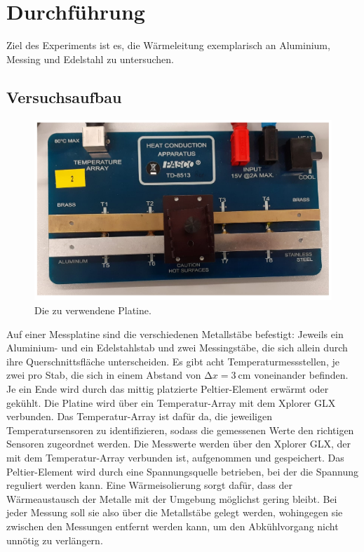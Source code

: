 \section{Durchführung}
\label{sec:Durchführung}
Ziel des Experiments ist es, die Wärmeleitung exemplarisch an Aluminium, Messing und Edelstahl zu untersuchen. 
\subsection{Versuchsaufbau}
\begin{figure}
    \centering
    \includegraphics[width=\textwidth]{content/platine_photo.pdf}
    \caption{Die zu verwendene Platine.}
    \label{fig:platine}
\end{figure}
Auf einer Messplatine sind die verschiedenen Metallstäbe befestigt: 
Jeweils ein Aluminium- und ein Edelstahlstab und zwei Messingstäbe, die sich allein durch ihre Querschnittsfläche unterscheiden.
Es gibt acht Temperaturmessstellen, je zwei pro Stab, die sich in einem Abstand von $ \increment x = \SI{3}{\centi\meter}$ voneinander befinden. 
Je ein Ende wird durch das mittig platzierte Peltier-Element erwärmt oder gekühlt. 
Die Platine wird über ein Temperatur-Array mit dem Xplorer GLX verbunden. 
Das Temperatur-Array ist dafür da, die jeweiligen Temperatursensoren zu identifizieren, sodass die gemessenen Werte den richtigen Sensoren zugeordnet werden.
Die Messwerte werden über den Xplorer GLX, der mit dem Temperatur-Array verbunden ist, aufgenommen und gespeichert. 
Das Peltier-Element wird durch eine Spannungsquelle betrieben, bei der die Spannung reguliert werden kann. 
Eine Wärmeisolierung sorgt dafür, dass der Wärmeaustausch der Metalle mit der Umgebung möglichst gering bleibt.
Bei jeder Messung soll sie also über die Metallstäbe gelegt werden, wohingegen sie zwischen den Messungen entfernt 
werden kann, um den Abkühlvorgang nicht unnötig zu verlängern. 
